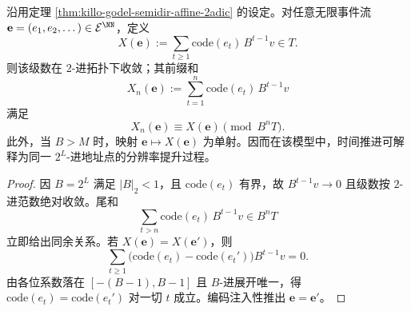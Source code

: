 \begin{corollary}\label{cor:killo-infinite-stream-2adic-holographic-point}
沿用定理 \ref{thm:killo-godel-semidir-affine-2adic} 的设定。对任意无限事件流 \(\mathbf e=(e_1,e_2,\dots)\in\mathcal E^{\NN}\)，定义
\[
X(\mathbf e):=\sum_{t\ge 1}\mathrm{code}(e_t)\,B^{t-1}v\in T.
\]
则该级数在 \(2\)-进拓扑下收敛；其前缀和
\[
X_n(\mathbf e):=\sum_{t=1}^{n}\mathrm{code}(e_t)\,B^{t-1}v
\]
满足
\[
X_n(\mathbf e)\equiv X(\mathbf e)\pmod{B^nT}.
\]
此外，当 \(B>M\) 时，映射 \(\mathbf e\mapsto X(\mathbf e)\) 为单射。因而在该模型中，时间推进可解释为同一 \(2^L\)-进地址点的分辨率提升过程。
\end{corollary}
\begin{proof}
因 \(B=2^L\) 满足 \(|B|_2<1\)，且 \(\mathrm{code}(e_t)\) 有界，故 \(B^{t-1}v\to 0\) 且级数按 \(2\)-进范数绝对收敛。尾和
\[
\sum_{t>n}\mathrm{code}(e_t)\,B^{t-1}v\in B^nT
\]
立即给出同余关系。若 \(X(\mathbf e)=X(\mathbf e')\)，则
\[
\sum_{t\ge 1}\bigl(\mathrm{code}(e_t)-\mathrm{code}(e_t')\bigr)B^{t-1}v=0.
\]
由各位系数落在 \([-(B-1),B-1]\) 且 \(B\)-进展开唯一，得
\(\mathrm{code}(e_t)=\mathrm{code}(e_t')\) 对一切 \(t\) 成立。编码注入性推出 \(\mathbf e=\mathbf e'\)。
\end{proof}



